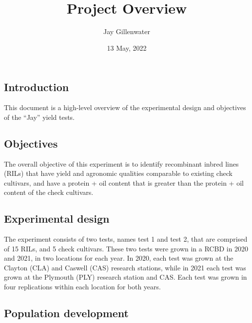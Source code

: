 \documentclass[
]{article}
\title{Project Overview}
\author{Jay Gillenwater}
\date{13 May, 2022}
\begin{document}
\maketitle

\hypertarget{introduction}{%
\subsection{Introduction}\label{introduction}}

This document is a high-level overview of the experimental design and
objectives of the ``Jay'' yield tests.

\hypertarget{objectives}{%
\subsection{Objectives}\label{objectives}}

The overall objective of this experiment is to identify recombinant
inbred lines (RILs) that have yield and agronomic qualities comparable
to existing check cultivars, and have a protein + oil content that is
greater than the protein + oil content of the check cultivars.

\hypertarget{experimental-design}{%
\subsection{Experimental design}\label{experimental-design}}

The experiment consists of two tests, names test 1 and test 2, that are
comprised of 15 RILs, and 5 check cultivars. These two tests were grown
in a RCBD in 2020 and 2021, in two locations for each year. In 2020,
each test was grown at the Clayton (CLA) and Caswell (CAS) research
stations, while in 2021 each test was grown at the Plymouth (PLY)
research station and CAS. Each test was grown in four replications
within each location for both years.

\hypertarget{population-development}{%
\subsection{Population development}\label{population-development}}
\end{document}
